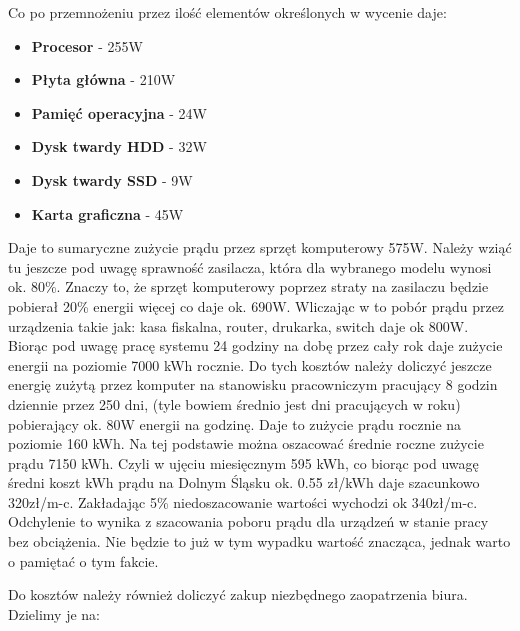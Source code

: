 			\par Co po przemnożeniu przez ilość elementów określonych w wycenie daje:
						
			\begin{itemize}
				\item{\textbf{Procesor}} - 255W
					
				\item{\textbf{Płyta główna}} - 210W
					
				\item{\textbf{Pamięć operacyjna}} - 24W
					
				\item{\textbf{Dysk twardy HDD}} - 32W
					
				\item{\textbf{Dysk twardy SSD}} - 9W
					
				\item{\textbf{Karta graficzna}} - 45W
			\end{itemize}
				
		\par Daje to sumaryczne zużycie prądu przez sprzęt komputerowy 575W. Należy wziąć tu jeszcze pod uwagę sprawność zasilacza, która dla wybranego modelu wynosi ok. 80\%. Znaczy to, że sprzęt komputerowy poprzez straty na zasilaczu będzie pobierał 20\% energii więcej co daje ok. 690W. Wliczając w to pobór prądu przez urządzenia takie jak: kasa fiskalna, router, drukarka, switch daje ok 800W. Biorąc pod uwagę pracę systemu 24 godziny na dobę przez cały rok daje zużycie energii na poziomie 7000 kWh rocznie. Do tych kosztów należy doliczyć jeszcze energię zużytą przez komputer na stanowisku pracowniczym pracujący 8 godzin dziennie przez 250 dni, (tyle bowiem średnio jest dni pracujących w roku) pobierający ok. 80W energii na godzinę. Daje to zużycie prądu rocznie na poziomie 160 kWh. Na tej podstawie można oszacować średnie roczne zużycie prądu 7150 kWh. Czyli w ujęciu miesięcznym 595 kWh, co biorąc pod uwagę średni koszt kWh prądu na Dolnym Śląsku ok. 0.55 zł/kWh daje szacunkowo 320zł/m-c. Zakładając 5\% niedoszacowanie wartości wychodzi ok 340zł/m-c. Odchylenie to wynika z szacowania poboru prądu dla urządzeń w stanie pracy bez obciążenia. Nie będzie to już w tym wypadku wartość znacząca, jednak warto o pamiętać o tym fakcie.
	
	
	\par Do kosztów  należy również doliczyć zakup niezbędnego zaopatrzenia biura. Dzielimy je na:
	
